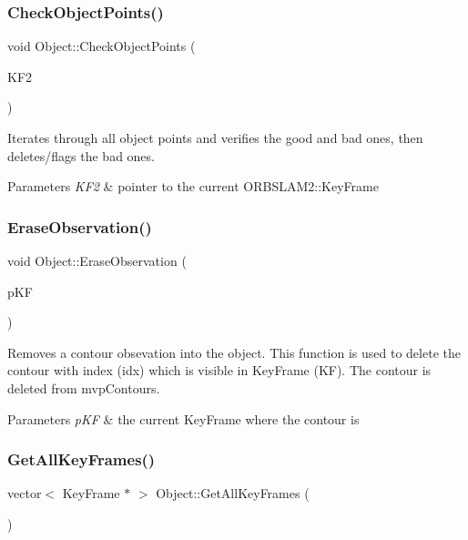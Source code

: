 \subsubsection{\texorpdfstring{Check\+Object\+Points()}{CheckObjectPoints()}}
{\footnotesize\ttfamily void Object\+::\+Check\+Object\+Points (\begin{DoxyParamCaption}\item[{Key\+Frame $\ast$}]{K\+F2 }\end{DoxyParamCaption})}

Iterates through all object points and verifies the good and bad ones, then deletes/flags the bad ones. 
\begin{DoxyParams}{Parameters}
{\em K\+F2} & pointer to the current O\+R\+B\+S\+L\+A\+M2\+::\+Key\+Frame \\
\hline
\end{DoxyParams}
\mbox{\label{classObject_a2f6308e77b95e3302a2f60c838839a20}} 
\subsubsection{\texorpdfstring{Erase\+Observation()}{EraseObservation()}}
{\footnotesize\ttfamily void Object\+::\+Erase\+Observation (\begin{DoxyParamCaption}\item[{Key\+Frame $\ast$}]{p\+KF }\end{DoxyParamCaption})}

Removes a contour obsevation into the object. This function is used to delete the contour with index (idx) which is visible in Key\+Frame (KF). The contour is deleted from mvp\+Contours. 
\begin{DoxyParams}{Parameters}
{\em p\+KF} & the current Key\+Frame where the contour is \\
\hline
\end{DoxyParams}
\mbox{\label{classObject_ad2535d39e437bf0ea9ff663dbfd3b7d0}} 
\subsubsection{\texorpdfstring{Get\+All\+Key\+Frames()}{GetAllKeyFrames()}}
{\footnotesize\ttfamily vector$<$ Key\+Frame $\ast$ $>$ Object\+::\+Get\+All\+Key\+Frames (\begin{DoxyParamCaption}{ }\end{DoxyParamCaption})}

